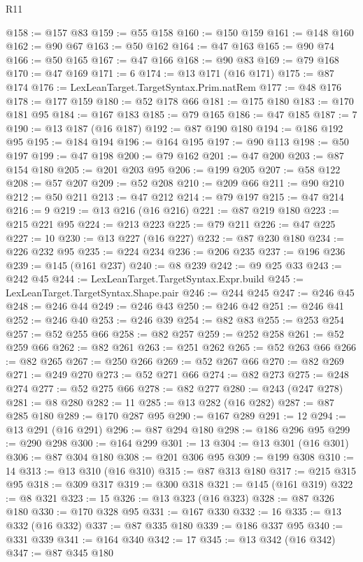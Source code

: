 \begin{lexlean}{R11}
\begin{coremodule}
@158 := @157 @83
@159 := @55 @158
@160 := @150 @159
@161 := @148 @160
@162 := @90 @67
@163 := @50 @162
@164 := @47 @163
@165 := @90 @74
@166 := @50 @165
@167 := @47 @166
@168 := @90 @83
@169 := @79 @168
@170 := @47 @169
@171 := 6
@174 := @13 @171 (@16 @171)
@175 := @87 @174
@176 := LexLeanTarget.TargetSyntax.Prim.natRem
@177 := @48 @176
@178 := @177 @159
@180 := @52 @178 @66
@181 := @175 @180
@183 := @170 @181 @95
@184 := @167 @183
@185 := @79 @165
@186 := @47 @185
@187 := 7
@190 := @13 @187 (@16 @187)
@192 := @87 @190 @180
@194 := @186 @192 @95
@195 := @184 @194
@196 := @164 @195
@197 := @90 @113
@198 := @50 @197
@199 := @47 @198
@200 := @79 @162
@201 := @47 @200
@203 := @87 @154 @180
@205 := @201 @203 @95
@206 := @199 @205
@207 := @58 @122
@208 := @57 @207
@209 := @52 @208
@210 := @209 @66
@211 := @90 @210
@212 := @50 @211
@213 := @47 @212
@214 := @79 @197
@215 := @47 @214
@216 := 9
@219 := @13 @216 (@16 @216)
@221 := @87 @219 @180
@223 := @215 @221 @95
@224 := @213 @223
@225 := @79 @211
@226 := @47 @225
@227 := 10
@230 := @13 @227 (@16 @227)
@232 := @87 @230 @180
@234 := @226 @232 @95
@235 := @224 @234
@236 := @206 @235
@237 := @196 @236
@239 := @145 (@161 @237)
@240 := @8 @239
@242 := @9 @25 @33
@243 := @242 @45
@244 := LexLeanTarget.TargetSyntax.Expr.build
@245 := LexLeanTarget.TargetSyntax.Shape.pair
@246 := @244 @245
@247 := @246 @45
@248 := @246 @44
@249 := @246 @43
@250 := @246 @42
@251 := @246 @41
@252 := @246 @40
@253 := @246 @39
@254 := @82 @83
@255 := @253 @254
@257 := @52 @255 @66
@258 := @82 @257
@259 := @252 @258
@261 := @52 @259 @66
@262 := @82 @261
@263 := @251 @262
@265 := @52 @263 @66
@266 := @82 @265
@267 := @250 @266
@269 := @52 @267 @66
@270 := @82 @269
@271 := @249 @270
@273 := @52 @271 @66
@274 := @82 @273
@275 := @248 @274
@277 := @52 @275 @66
@278 := @82 @277
@280 := @243 (@247 @278)
@281 := @8 @280
@282 := 11
@285 := @13 @282 (@16 @282)
@287 := @87 @285 @180
@289 := @170 @287 @95
@290 := @167 @289
@291 := 12
@294 := @13 @291 (@16 @291)
@296 := @87 @294 @180
@298 := @186 @296 @95
@299 := @290 @298
@300 := @164 @299
@301 := 13
@304 := @13 @301 (@16 @301)
@306 := @87 @304 @180
@308 := @201 @306 @95
@309 := @199 @308
@310 := 14
@313 := @13 @310 (@16 @310)
@315 := @87 @313 @180
@317 := @215 @315 @95
@318 := @309 @317
@319 := @300 @318
@321 := @145 (@161 @319)
@322 := @8 @321
@323 := 15
@326 := @13 @323 (@16 @323)
@328 := @87 @326 @180
@330 := @170 @328 @95
@331 := @167 @330
@332 := 16
@335 := @13 @332 (@16 @332)
@337 := @87 @335 @180
@339 := @186 @337 @95
@340 := @331 @339
@341 := @164 @340
@342 := 17
@345 := @13 @342 (@16 @342)
@347 := @87 @345 @180

\end{coremodule}
\end{lexlean}
